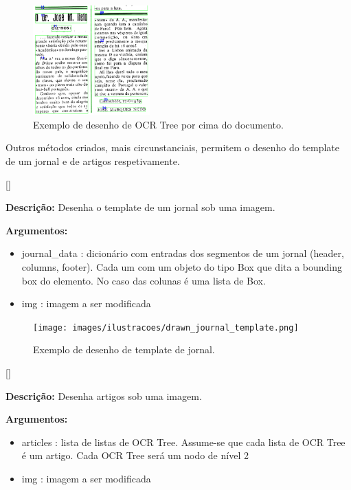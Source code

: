 \begin{figure}[H]
	 	\centering
	 	\includegraphics[width=0.4\textwidth]{images/ilustracoes/drawn_blocks.png}
	 	\caption{Exemplo de desenho de OCR Tree por cima do documento.}
	 	\label{fig:draw_ocr_results}
\end{figure}

Outros métodos criados, mais circunstanciais, permitem o desenho do template de um jornal e de artigos respetivamente.

[\normalsize]

\textbf{Descrição:} Desenha o template de um jornal sob uma imagem.

\textbf{Argumentos:}
\begin{itemize}\setlength\itemsep{-0.3em}
	\item journal\_data : dicionário com entradas dos segmentos de um jornal (header, columns, footer). Cada um com um objeto do tipo Box que dita a bounding box do elemento. No caso das colunas é uma lista de Box.
	\item img : imagem a ser modificada
\end{itemize}


\begin{figure}[H]
	\centering
	\texttt{[image: images/ilustracoes/drawn\_journal\_template.png]}
	\caption{Exemplo de desenho de template de jornal.}
	\label{fig:draw_journal_template}
\end{figure}



[\normalsize]

\textbf{Descrição:} Desenha artigos sob uma imagem.

\textbf{Argumentos:}
\begin{itemize}\setlength\itemsep{-0.3em}
	\item articles : lista de listas de OCR Tree. Assume-se que cada lista de OCR Tree é um artigo. Cada OCR Tree será um nodo de nível 2
	\item img : imagem a ser modificada
\end{itemize}

